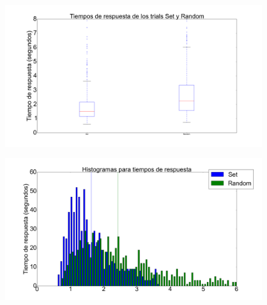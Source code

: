 \documentclass{beamer}
\begin{document}
\begin{frame}
\begin{figure}[h]
 \centering
  \begin{minipage}[c]{1\textwidth}
	\centering	
	\includegraphics[scale=0.22]{rt.png}
  \end{minipage}
\end{figure}
\end{frame}

\begin{frame}
\begin{figure}[c]
 \centering
  \begin{minipage}[c]{1\textwidth}
	\centering	
	\includegraphics[scale=0.22]{rt_hist.png}
  \end{minipage}
\end{figure}
\end{frame}
\end{document}
